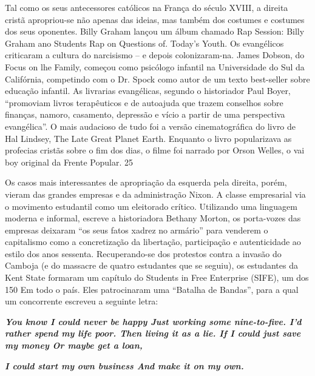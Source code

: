 Tal como os seus antecessores católicos na França do século XVIII, a direita cristã apropriou-se não apenas das ideias, mas também dos costumes e costumes dos seus oponentes. Billy Graham lançou um álbum chamado Rap Session: Billy Graham ano Students Rap on Questions of. Today’s Youth. Os evangélicos criticaram a cultura do narcisismo – e depois colonizaram-na. James Dobson, do Focus on lhe Family, começou como psicólogo infantil na Universidade do Sul da Califórnia, competindo com o Dr. Spock como autor de um texto best-seller sobre educação infantil. As livrarias evangélicas, segundo o historiador Paul Boyer, “promoviam livros terapêuticos e de autoajuda que trazem conselhos sobre finanças, namoro, casamento, depressão e vício a partir de uma perspectiva evangélica”. O mais audacioso de tudo foi a versão cinematográfica do livro de Hal Lindsey, The Late Great Planet Earth. Enquanto o livro popularizava as profecias cristãs sobre o fim dos dias, o filme foi narrado por Orson Welles, o vai boy original da Frente Popular.
 {\color{blue} 25}  

 
\par
 
Os casos mais interessantes de apropriação da esquerda pela direita, porém, vieram das grandes empresas e da administração Nixon. A classe empresarial via o movimento estudantil como um eleitorado crítico. Utilizando uma linguagem moderna e informal, escreve a historiadora Bethany Morton, os porta-vozes das empresas deixaram “os seus fatos xadrez no armário” para venderem o capitalismo como a concretização da libertação, participação e autenticidade ao estilo dos anos sessenta. Recuperando-se dos protestos contra a invasão do Camboja (e do massacre de quatro estudantes que se seguiu), os estudantes da Kent State formaram um capítulo do Students in Free Enterprise (SIFE), um dos
 {\color{blue} 150}  
Em todo o país. Eles patrocinaram uma “Batalha de Bandas”, para a qual um concorrente escreveu a seguinte letra:
 
\par
 

 \textbf{\textit{You know I could never be happy Just working some nine-to-five. I’d rather spend my life poor. Then living it as a lie. If I could just save my money Or maybe get a loan,} }  
 
 
\par
 

 
\par
 

 \textbf{\textit{I could start my own business And make it on my own.} }  
 
